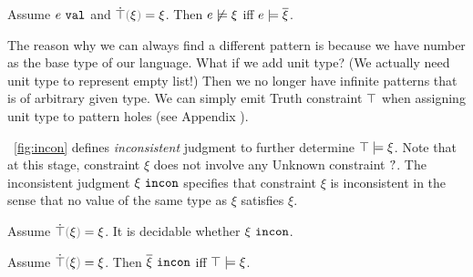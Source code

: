 \begin{lemma}
  Assume $e ~\mathtt{val}$ and $\ctruify{\xi}=\xi$. Then $e \not\models \xi$ iff $e \models \overline{\xi}$.
\end{lemma}

The reason why we can always find a different pattern is because we have number as the base type of our language. What if we add unit type? (We actually need unit type to represent empty list!) Then we no longer have infinite patterns that is of arbitrary given type. We can simply emit Truth constraint $\top$ when assigning unit type to pattern holes (see Appendix \todo{}).

\figurename~\ref{fig:incon} defines \textit{inconsistent} judgment to further determine $\top \models \xi$. Note that at this stage, constraint $\xi$ does not involve any Unknown constraint $\mathtt{?}$. The inconsistent judgment $\xi ~\mathtt{incon}$ specifies that constraint $\xi$ is inconsistent in the sense that no value of the same type as $\xi$ satisfies $\xi$.



\begin{theorem}
\textbf{}  Assume $\ctruify{\xi}=\xi$. It is decidable whether $\xi ~\mathtt{incon}$.
\end{theorem}

\begin{theorem}
  Assume $\ctruify{\xi}=\xi$. Then $\overline{\xi} ~\mathtt{incon}$ iff $\top \models \xi$.
\end{theorem}
